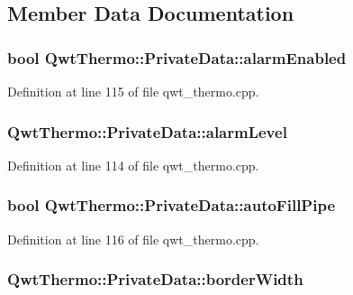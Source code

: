 \subsection{Member Data Documentation}
\hypertarget{class_qwt_thermo_1_1_private_data_a1f0b338b9a014e608e962e45714c871f}{
\subsubsection[{alarm\-Enabled}]{\setlength{\rightskip}{0pt plus 5cm}bool Qwt\-Thermo\-::\-Private\-Data\-::alarm\-Enabled}}\label{class_qwt_thermo_1_1_private_data_a1f0b338b9a014e608e962e45714c871f}


Definition at line 115 of file qwt\-\_\-thermo.\-cpp.

\hypertarget{class_qwt_thermo_1_1_private_data_ac808fc63218335aba5da0725bf559fef}{
\subsubsection[{alarm\-Level}]{ Qwt\-Thermo\-::\-Private\-Data\-::alarm\-Level}}\label{class_qwt_thermo_1_1_private_data_ac808fc63218335aba5da0725bf559fef}


Definition at line 114 of file qwt\-\_\-thermo.\-cpp.

\hypertarget{class_qwt_thermo_1_1_private_data_a375dde5349d6fc28b2e6aadb07049266}{
\subsubsection[{auto\-Fill\-Pipe}]{\setlength{\rightskip}{0pt plus 5cm}bool Qwt\-Thermo\-::\-Private\-Data\-::auto\-Fill\-Pipe}}\label{class_qwt_thermo_1_1_private_data_a375dde5349d6fc28b2e6aadb07049266}


Definition at line 116 of file qwt\-\_\-thermo.\-cpp.

\hypertarget{class_qwt_thermo_1_1_private_data_ac72edba4276e601c5e98dd8438053f1d}{
\subsubsection[{border\-Width}]{ Qwt\-Thermo\-::\-Private\-Data\-::border\-Width}}\label{class_qwt_thermo_1_1_private_data_ac72edba4276e601c5e98dd8438053f1d}


